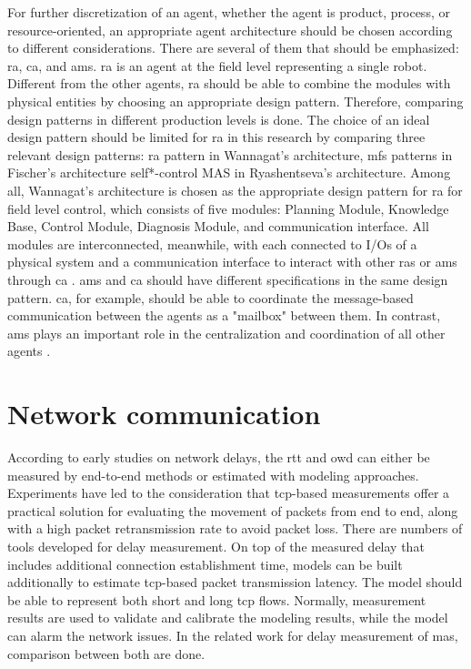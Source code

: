 For further discretization of an agent, whether the agent is product, 
process, or resource-oriented, an appropriate agent architecture should 
be chosen according to different considerations. There are several of 
them that should be emphasized: \gls{ra}, \gls{ca}, and \gls{ams}. 
\gls{ra} is an agent at the field level representing a single robot. 
Different from the other agents, \gls{ra} should be able to combine 
the modules with physical entities by choosing an appropriate design 
pattern. Therefore, comparing design patterns in different production 
levels is done\cite{ocker_leveraging_2021}. The choice of an ideal 
design pattern should be limited for \gls{ra} in this research by 
comparing three relevant design patterns:  \gls{ra} pattern in Wannagat’s 
architecture, \gls{mfs} patterns in Fischer’s architecture self*-control 
MAS in Ryashentseva’s architecture. Among all,  Wannagat’s architecture 
is chosen as the appropriate design pattern for \gls{ra} for field level 
control, which consists of five modules: Planning Module, Knowledge Base, 
Control Module, Diagnosis Module, and communication interface. 
All modules are interconnected, meanwhile, with each connected to 
I/Os of a physical system and a communication interface to interact 
with other \gls{ras} or \gls{ams} through \gls{ca} \cite{cruz_salazar_cyber-physical_2019}. 
\gls{ams} and \gls{ca} should have different specifications in the 
same design pattern. \gls{ca}, for example, should be able to coordinate 
the message-based communication between the agents as a "mailbox" 
between them. In contrast, \gls{ams} plays an important role in the 
centralization and coordination of all other agents \cite{wannagat_entwicklung_2010}. 




\section{Network communication}
According to early studies on network delays, the \gls{rtt} and \gls{owd} 
can either be measured by end-to-end methods or estimated with modeling 
approaches. Experiments have led to the consideration that \gls{tcp}-based 
measurements offer a practical solution for evaluating the movement of 
packets from end to end, along with a high packet retransmission rate 
to avoid packet loss\cite{paxson_end--end_1999}. There are numbers of tools 
developed for delay measurement.
On top of the measured delay 
that includes additional connection establishment time, 
models can be built additionally to estimate 
\gls{tcp}-based packet transmission latency. The model should be able to 
represent both short and long \gls{tcp} flows\cite{luan_estimating_2019}. 
Normally, measurement results are used to validate and calibrate the modeling 
results, while the model can alarm the network issues. In the related work 
for delay measurement of \gls{mas}, comparison between both are done\cite{vogel-heuser_delay_2023}.



